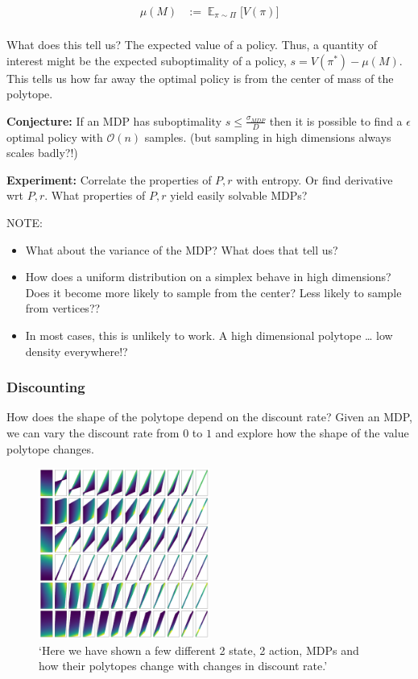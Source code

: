 \begin{align*}
\mu(M) &:= \mathop{\mathbb E}_{\pi\sim\Pi}\Big[V(\pi) \Big]\\
\end{align*}

What does this tell us? The expected value of a policy. Thus, a quantity
of interest might be the expected suboptimality of a policy,
\(s = V(\pi^{* })-\mu(M)\). This tells us how far away the optimal
policy is from the center of mass of the polytope.

\textbf{Conjecture:} If an MDP has suboptimality
\(s \le \frac{\sigma_{MDP}}{D}\) then it is possible to find a
\(\epsilon\) optimal policy with \(\mathcal O(n)\) samples. (but
sampling in high dimensions always scales badly?!)

\textbf{Experiment:} Correlate the properties of \(P, r\) with entropy.
Or find derivative wrt \(P, r\). What properties of \(P, r\) yield
easily solvable MDPs?

NOTE:

\begin{itemize}
\item
  What about the variance of the MDP? What does that tell us?
\item
  How does a uniform distribution on a simplex behave in high
  dimensions? Does it become more likely to sample from the center? Less
  likely to sample from vertices??
\item
  In most cases, this is unlikely to work. A high dimensional polytope
  \ldots{} low density everywhere!?
\end{itemize}


\subsubsection{Discounting}

How does the shape of the polytope depend on the discount rate? Given an
MDP, we can vary the discount rate from \(0\) to \(1\) and explore how
the shape of the value polytope changes.

\begin{figure}
\centering
\includegraphics[width=0.5\textwidth,height=0.5\textheight]{../../pictures/figures/discounts.png}
\caption{`Here we have shown a few different 2 state, 2 action, MDPs and how their polytopes change with changes in discount rate.'}
\end{figure}

